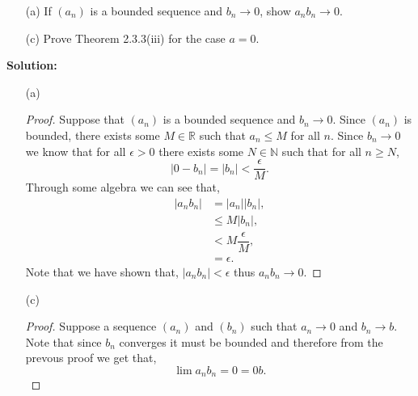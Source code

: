 \documentclass[12pt]{article}
\makeatletter
\theoremstyle{homework}
\newenvironment{exercise}[1]
{\def\@currentlabel{#1}\exercisecore}
{\endexercisecore}
\newcommand{\localhead}[1]{\par\smallskip\noindent\textbf{#1}\nobreak\\}%
\newcommand\solution{\localhead{Solution:}}
\newcommand{\Reals}{\ensuremath{\mathbb R}}
\newcommand{\Nats}{\ensuremath{\mathbb N}}
\makeatother
\begin{document}
\begin{exercise}{2.3.9(a)(c)}
\strut
\begin{enumerate}
	\item[(a)] If $(a_n)$ is a bounded sequence and $b_n\to 0$,
	show $a_nb_n\to 0$.
	\item[(c)] Prove Theorem 2.3.3(iii) for the case $a=0$.
\end{enumerate}
\end{exercise}
\solution
\begin{enumerate}
	\item[(a)] 
	\begin{proof} Suppose that $(a_n)$ is a bounded sequence and $b_n\to 0$. Since $(a_n)$ is bounded, there exists some $M \in \Reals$
		such that $a_n \le M$ for all $n$. Since $b_n \to 0$ we know that for all $\epsilon > 0$ there exists some $N \in \Nats$ such that for all $n \geq N$, 
		\begin{equation*}
			|0 - b_n| = |b_n| < \frac{\epsilon}{M}.
		\end{equation*} 
		Through some algebra we can see that, 
		\begin{align*}
			|a_nb_n| &= |a_n||b_n|,\\
			&\le M|b_n|,\\
			&< M\dfrac{\epsilon}{M},\\ 
			&= \epsilon.  
		\end{align*}
		Note that we have shown that, $|a_nb_n| < \epsilon$ thus $a_nb_n\to 0$.


	\end{proof}
	\item[(c)]
	\begin{proof} Suppose a sequence $(a_n)$ and $(b_n)$ such that $a_n\to 0$ and $b_n\to b$. Note that since $b_n$ converges it must be bounded and therefore from the prevous proof we get
		that,
		\begin{equation*}
	\lim a_nb_n = 0 = 0b.
		\end{equation*}
		
	\end{proof}
\end{enumerate}
\end{document}

